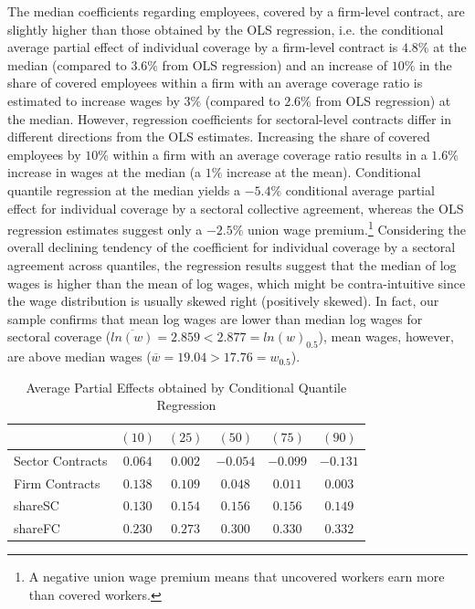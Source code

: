 The median coefficients regarding employees, covered by a firm-level contract, are slightly higher than those obtained by the OLS regression, i.e. the conditional average partial effect of individual coverage by a firm-level contract is $4.8\%$ at the median (compared to $3.6\%$ from OLS regression) and an increase of $10\%$ in the share of covered employees within a firm with an average coverage ratio is estimated to increase wages by $3\%$ (compared to $2.6\%$ from OLS regression) at the median. However, regression coefficients for sectoral-level contracts differ in different directions from the OLS estimates. Increasing the share of covered employees by $10\%$ within a firm with an average coverage ratio results in a $1.6\%$ increase in wages at the median (a $1\%$ increase at the mean). Conditional quantile regression at the median yields a $-5.4\%$ conditional average partial effect for individual coverage by a sectoral collective agreement, whereas the OLS regression estimates suggest only a $-2.5\%$ union wage premium.\footnote{ A negative union wage premium means that uncovered workers earn more than covered workers.} Considering the overall declining tendency of the coefficient for individual coverage by a sectoral agreement across quantiles, the regression results suggest that the median of log wages is higher than the mean of log wages, which might be contra-intuitive since the wage distribution is usually skewed right (positively skewed). In fact, our sample confirms that mean log wages are lower than median log wages for sectoral coverage ($\overline{ln(w)}=2.859<2.877=ln(w)_{0.5}$), mean wages, however, are above median wages ($\overline{w}=19.04>17.76=w_{0.5}$).

\begin{table}[]
\scriptsize
\centering
\caption{Average Partial Effects obtained by Conditional Quantile Regression}
\label{APEs:CQR}
\begin{tabular}{l|ccccc}

                    & $(10)$ & $(25)$ & $(50)$ & $(75)$ & $(90)$ \\
  \hline
  Sector Contracts  & $0.064$ & $0.002$ & $-0.054$ & $-0.099$ & $-0.131$ \\
  Firm Contracts    & $0.138$ & $0.109$ & $0.048$ & $0.011$ & $0.003$ \\
  shareSC           & $0.130$ & $0.154$ & $0.156$ & $0.156$ & $0.149$ \\
  shareFC           & $0.230$ & $0.273$ & $0.300$ & $0.330$ & $0.332$ \\
  \hline
\end{tabular}
\end{table}

